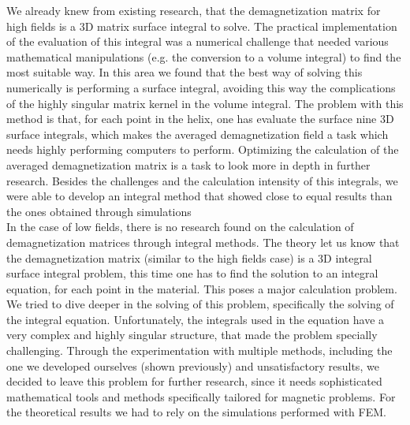 We already knew from existing research, that the demagnetization matrix for high fields is a 3D matrix surface integral to solve. The practical implementation of the evaluation of this integral was a numerical challenge that needed various mathematical manipulations (e.g. the conversion to a volume integral) to find the most suitable way. In this area we found that the best way of solving this numerically is performing a surface integral, avoiding this way the complications of the highly singular matrix kernel in the volume integral. The problem with this method is that, for each point in the helix, one has evaluate the surface nine 3D surface integrals, which makes the averaged demagnetization field a task which needs highly performing computers to perform. Optimizing the calculation of the averaged demagnetization matrix is a task to look more in depth in further research. Besides the challenges and the calculation intensity of this integrals, we were able to develop an integral method that showed close to equal results than the ones obtained through simulations\\

In the case of low fields, there is no research found on the calculation of demagnetization matrices through integral methods. The theory let us know that the demagnetization matrix (similar to the high fields case) is a 3D integral surface integral problem, this time one has to find the solution to an integral equation, for each point in the material. This poses a major calculation problem. We tried to dive deeper in the solving of this problem, specifically the solving of the integral equation. Unfortunately, the integrals used in the equation have a very complex and highly singular structure, that made the problem specially challenging. Through the experimentation with multiple methods, including the one we developed ourselves (shown previously) and unsatisfactory results, we decided to leave this problem for further research, since it needs sophisticated mathematical tools and methods specifically tailored for magnetic problems. For the theoretical results we had to rely on the simulations performed with FEM.\\

